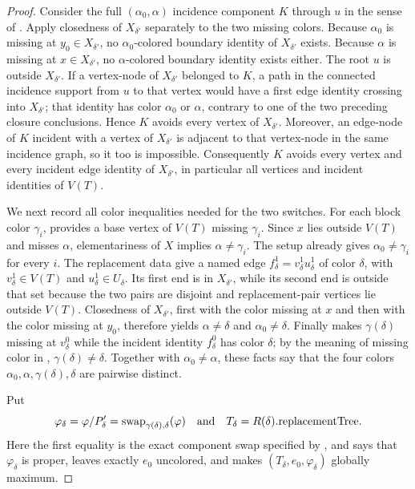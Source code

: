 \begin{proof}
Consider the full $(\alpha_0,\alpha)$ incidence component $K$ through
$u$ in the sense of .  Apply closedness of
$X_{\delta'}$ separately to the two missing colors.  Because $\alpha_0$
is missing at $y_0\in X_{\delta'}$, no $\alpha_0$-colored boundary
identity of $X_{\delta'}$ exists.  Because $\alpha$ is missing at
$x\in X_{\delta'}$, no $\alpha$-colored boundary identity exists either.
The root $u$ is outside $X_{\delta'}$.  If a vertex-node of
$X_{\delta'}$ belonged to $K$, a path in the connected incidence support
from $u$ to that vertex would have a first edge identity crossing into
$X_{\delta'}$; that identity has color $\alpha_0$ or $\alpha$, contrary
to one of the two preceding closure conclusions.  Hence $K$ avoids every
vertex of $X_{\delta'}$.  Moreover, an edge-node of $K$ incident with a
vertex of $X_{\delta'}$ is adjacent to that vertex-node in the same
incidence graph, so it too is impossible.  Consequently $K$ avoids every
vertex and every incident edge identity of $X_{\delta'}$, in particular
all vertices and incident identities of $V(T)$.

We next record all color inequalities needed for the two switches.  For
each block color $\gamma_i$, 
provides a base vertex of $V(T)$ missing $\gamma_i$.  Since $x$ lies
outside $V(T)$ and misses $\alpha$, elementariness of $X$ implies
$\alpha\ne\gamma_i$.  The setup already gives
$\alpha_0\ne\gamma_i$ for every $i$.  The replacement data
 give a named edge
$f^1_\delta=v^1_\delta u^1_\delta$ of color $\delta$, with
$v^1_\delta\in V(T)$ and $u^1_\delta\in U_\delta$.  Its first end is in
$X_{\delta'}$, while its second end is outside that set because the two
pairs are disjoint and replacement-pair vertices lie outside $V(T)$.
Closedness of $X_{\delta'}$, first with the color missing at $x$ and then
with the color missing at $y_0$, therefore yields
$\alpha\ne\delta$ and $\alpha_0\ne\delta$.  Finally
 makes $\gamma(\delta)$ missing at
$v^0_\delta$ while the incident identity $f^0_\delta$ has color
$\delta$; by the meaning of missing color in ,
$\gamma(\delta)\ne\delta$.  Together with
$\alpha_0\ne\alpha$, these facts say that the four colors
$\alpha_0,\alpha,\gamma(\delta),\delta$ are pairwise distinct.

Put
\[
 \varphi_\delta=
 \varphi/P'_{\delta}
 =\operatorname{swap}_{\gamma(\delta),\delta}(\varphi)
 \quad\hbox{and}\quad T_\delta=R(\delta).\mathrm{replacementTree}.
\]
Here the first equality is the exact component swap specified by
, and
 says that $\varphi_\delta$ is proper,
leaves exactly $e_0$ uncolored, and makes
$(T_\delta,e_0,\varphi_\delta)$ globally maximum.


\end{proof}
